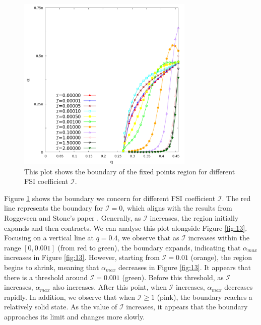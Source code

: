\documentclass[12pt,MSc,twoside]{muthesis_2020}
\begin{document}
\begin{figure}[!h]
	\begin{center}
		\includegraphics[width=0.75\textwidth]{plot/elastic_beam_general.png}
		\caption{This plot shows the boundary of the fixed points region for different FSI coefficient $\mathcal{I}$.}
    \label{fig:14}
	\end{center}
\end{figure}
Figure \ref{fig:14} shows the boundary we concern for different FSI coefficient $\mathcal{I}$. The red line represents the boundary for $\mathcal{I}=0$, which aligns with the results from Roggeveen and Stone's paper \cite{roggeveen2022motion}. Generally, as $\mathcal{I}$ increases, the region initially expands and then contracts. We can analyse this plot alongside Figure \ref{fig:13}. Focusing on a vertical line at $q = 0.4$, we observe that as $\mathcal{I}$ increases within the range $[0, 0.001]$ (from red to green), the boundary expands, indicating that $\alpha_{max}$ increases in Figure \ref{fig:13}. However, starting from  $\mathcal{I} = 0.01$ (orange), the region begins to shrink, meaning that $\alpha_{max}$ decreases in Figure \ref{fig:13}. It appears that there is a threshold around $\mathcal{I}=0.001$ (green). Before this threshold, as $\mathcal{I}$ increases, $\alpha_{max}$ also increases. After this point, when $\mathcal{I}$ increases, $\alpha_{max}$ decreases rapidly. In addition, we observe that when $\mathcal{I}\geq1$ (pink), the boundary reaches a relatively solid state. As the value of $\mathcal{I}$ increases, it appears that the boundary approaches its limit and changes more slowly.
\end{document}
